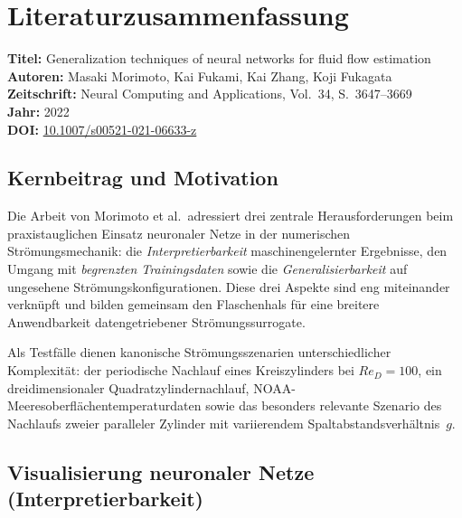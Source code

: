 \documentclass[a4paper,12pt]{article}
\begin{document}
\section*{Literaturzusammenfassung}

\noindent\textbf{Titel:} Generalization techniques of neural networks for fluid flow estimation \\
\textbf{Autoren:} Masaki Morimoto, Kai Fukami, Kai Zhang, Koji Fukagata \\
\textbf{Zeitschrift:} Neural Computing and Applications, Vol.\ 34, S.\ 3647--3669 \\
\textbf{Jahr:} 2022 \\
\textbf{DOI:} \href{https://doi.org/10.1007/s00521-021-06633-z}{10.1007/s00521-021-06633-z}

\subsection*{Kernbeitrag und Motivation}

Die Arbeit von Morimoto et al.\ adressiert drei zentrale Herausforderungen beim praxistauglichen Einsatz neuronaler Netze in der numerischen Strömungsmechanik: die \textit{Interpretierbarkeit} maschinengelernter Ergebnisse, den Umgang mit \textit{begrenzten Trainingsdaten} sowie die \textit{Generalisierbarkeit} auf ungesehene Strömungskonfigurationen. Diese drei Aspekte sind eng miteinander verknüpft und bilden gemeinsam den Flaschenhals für eine breitere Anwendbarkeit datengetriebener Strömungssurrogate.

Als Testfälle dienen kanonische Strömungsszenarien unterschiedlicher Komplexität: der periodische Nachlauf eines Kreiszylinders bei $Re_D = 100$, ein dreidimensionaler Quadratzylindernachlauf, NOAA-Meeresoberflächentemperaturdaten sowie das besonders relevante Szenario des Nachlaufs zweier paralleler Zylinder mit variierendem Spaltabstandsverhältnis~$g$.

\subsection*{Visualisierung neuronaler Netze (Interpretierbarkeit)}
\end{document}
